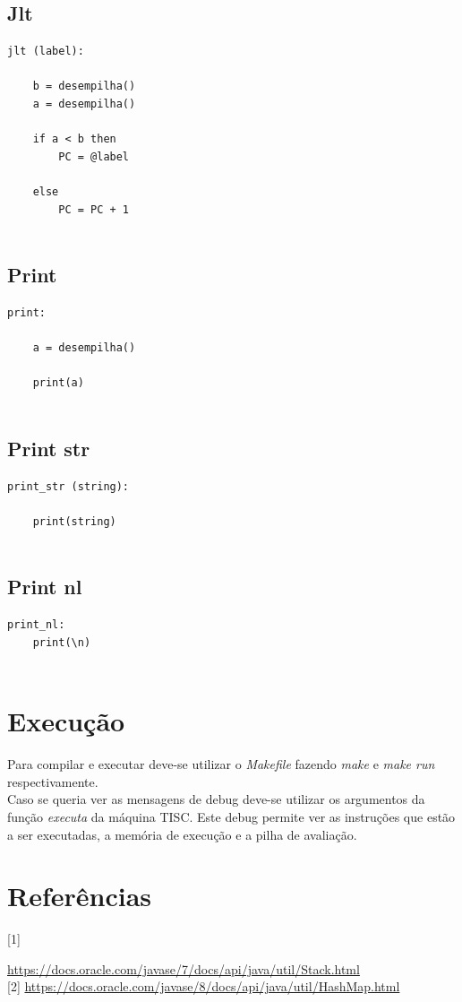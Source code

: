 \documentclass[a4paper,12pt,headings=small]{article}
\begin{document}
\subsection{Jlt}
\begin{lstlisting}
jlt (label):

	b = desempilha()
	a = desempilha()
	
	if a < b then
		PC = @label
		
	else
		PC = PC + 1	
	
\end{lstlisting}

\newpage

\subsection{Print}
\begin{lstlisting}
print:

	a = desempilha()
	
	print(a)
	
\end{lstlisting}


\subsection{Print str}
\begin{lstlisting}
print_str (string):

	print(string)
	
\end{lstlisting}


\subsection{Print nl}
\begin{lstlisting}
print_nl:
	print(\n)
	
\end{lstlisting}

\newpage

\section{Execução}
\FloatBarrier
Para compilar e executar deve-se utilizar o \textit{Makefile} fazendo \textit{make} e \textit{make run} respectivamente.\\
Caso se queria ver as mensagens de debug deve-se utilizar os argumentos da função \textit{executa} da máquina TISC. Este debug permite ver as instruções que estão a ser executadas, a memória de execução e a pilha de avaliação.


\section{Referências}
\hypertarget{stack}{[1]}    \url{https://docs.oracle.com/javase/7/docs/api/java/util/Stack.html}\\
\hypertarget{hashmap}{[2]}    \url{https://docs.oracle.com/javase/8/docs/api/java/util/HashMap.html}
\end{document}

